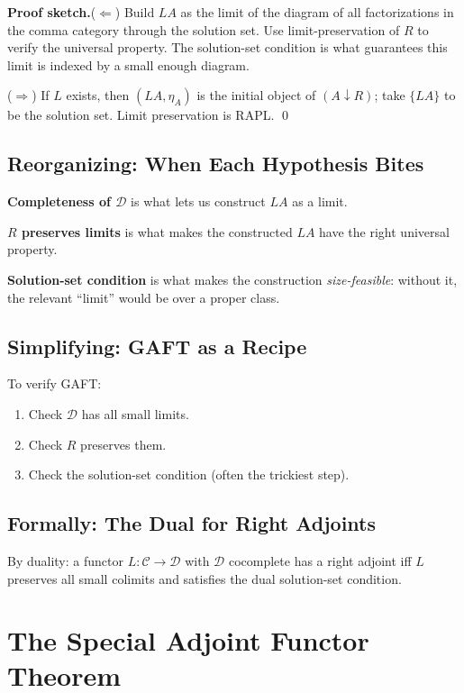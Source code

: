 \textbf{Proof sketch.}\quad ($\Leftarrow$) Build $L A$ as the limit of
the diagram of all factorizations in the comma category through the
solution set. Use limit-preservation of $R$ to verify the universal
property. The solution-set condition is what guarantees this limit is
indexed by a small enough diagram.

($\Rightarrow$) If $L$ exists, then $(L A, \eta_A)$ is the initial object
of $(A \downarrow R)$; take $\{L A\}$ to be the solution set. Limit
preservation is RAPL. \qed

\subsection{Reorganizing: When Each Hypothesis Bites}

\textbf{Completeness of $\mathcal{D}$} is what lets us construct $L A$
as a limit.

\textbf{$R$ preserves limits} is what makes the constructed $L A$ have
the right universal property.

\textbf{Solution-set condition} is what makes the construction
\emph{size-feasible}: without it, the relevant ``limit'' would be over a
proper class.

\subsection{Simplifying: GAFT as a Recipe}

To verify GAFT:
\begin{enumerate}
  \item Check $\mathcal{D}$ has all small limits.
  \item Check $R$ preserves them.
  \item Check the solution-set condition (often the trickiest step).
\end{enumerate}

\subsection{Formally: The Dual for Right Adjoints}

By duality: a functor $L : \mathcal{C} \to \mathcal{D}$ with
$\mathcal{D}$ cocomplete has a right adjoint iff $L$ preserves all small
colimits and satisfies the dual solution-set condition.


\section{The Special Adjoint Functor Theorem}
\label{sec:saft}

